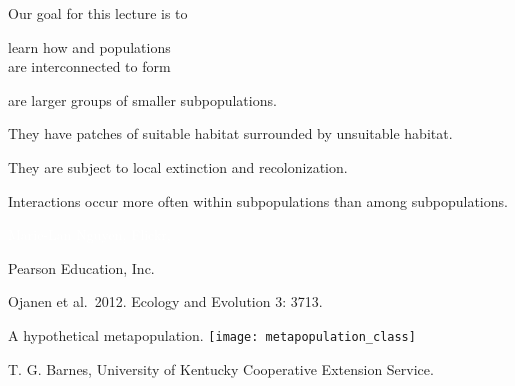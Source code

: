 \documentclass[t]{beamer}
\begin{document}

\begin{frame}{Our goal for this lecture is to}

	\hangpara learn how  and  populations\\are interconnected to form 
	
\end{frame}
%
%
%
\begin{frame}{ are larger groups of smaller subpopulations.}

	\hangpara They have patches of suitable habitat surrounded by unsuitable habitat.
	
	\hangpara They are subject to local extinction and recolonization.
	
	\hangpara Interactions occur more often within subpopulations than among subpopulations.

\end{frame}
%
{
\begin{frame}[b]
	\hfill \tiny	\textcolor{white}{Marie-Lan Nguyen, Flickr, }
\end{frame}
}
%
{
\begin{frame}[b]
	\tiny \textcopyright Pearson Education, Inc.
\end{frame}
}
%
{
\begin{frame}[b]
	\hfill \tiny Ojanen et al.~2012. Ecology and Evolution 3: 3713.
\end{frame}
}
%
\begin{frame}{A hypothetical metapopulation.}
	\centering
	\texttt{[image: metapopulation\_class]}
	
	\vfilll
	
	\hfill \tiny \textcopyright T. G. Barnes, University of Kentucky Cooperative Extension Service.
\end{frame}
\end{document}
